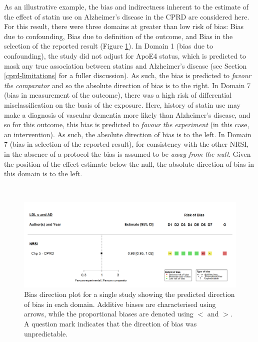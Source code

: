 \documentclass[a4paper, twoside]{templates/ociamthesis}
\begin{document}
As an illustrative example, the bias and indirectness inherent to the estimate of the effect of statin use on Alzheimer's disease in the CPRD are considered here. For this result, there were three domains at greater than low risk of bias: Bias due to confounding, Bias due to definition of the outcome, and Bias in the selection of the reported result (Figure \ref{fig:biasDirectionSingle}). In Domain 1 (bias due to confounding), the study did not adjust for ApoE4 status, which is predicted to mask any true association between statins and Alzheimer's disease (see Section \ref{cprd-limitations} for a fuller discussion). As such, the bias is predicted to \emph{favour the comparator} and so the absolute direction of bias is to the right. In Domain 7 (bias in measurement of the outcome), there was a high risk of differential misclassification on the basis of the exposure. Here, history of statin use may make a diagnosis of vascular dementia more likely than Alzheimer's disease, and so for this outcome, this bias is predicted to \emph{favour the experiment} (in this case, an intervention). As such, the absolute direction of bias is to the left. In Domain 7 (bias in selection of the reported result), for consistency with the other NRSI, in the absence of a protocol the bias is assumed to be \emph{away from the null}. Given the position of the effect estimate below the null, the absolute direction of bias in this domain is to the left.

~\\




\begin{figure}[H]
\includegraphics[width=1\linewidth]{figures/tri/midlife_AD_single} \caption[Bias direction plot for a single study]{Bias direction plot for a single study showing the predicted direction of bias in each domain. Additive biases are characterised using arrows, while the proportional biases are denoted using \(<\) and \(>\). A question mark indicates that the direction of bias was unpredictable.}\label{fig:biasDirectionSingle}
\end{figure}
\end{document}
